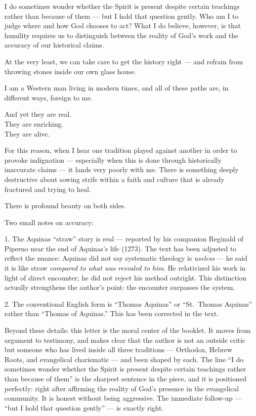 \documentclass[10pt,twoside,openany]{book}
\begin{document}
I do sometimes wonder whether the Spirit is present despite certain
teachings rather than because of them --- but I hold that question
gently. Who am I to judge where and how God chooses to act? What I do
believe, however, is that humility requires us to distinguish between
the reality of God's work and the accuracy of our historical claims.

At the very least, we can take care to get the history right --- and
refrain from throwing stones inside our own glass house.

I am a Western man living in modern times, and all of these paths are,
in different ways, foreign to me.

\bigskip

And yet they are real.\\
They are enriching.\\
They are alive.

\bigskip

For this reason, when I hear one tradition played against another in
order to provoke indignation --- especially when this is done through
historically inaccurate claims --- it lands very poorly with me. There is
something deeply destructive about sowing strife within a faith and
culture that is already fractured and trying to heal.

\medskip

There is profound beauty on both sides.

\begin{reviewerfinalbox}
Two small notes on accuracy:

1. The Aquinas ``straw'' story is real --- reported by his
companion Reginald of Piperno near the end of Aquinas's
life (1273). The text has been adjusted to reflect the
nuance: Aquinas did not say systematic theology is
\emph{useless} --- he said it is like straw \emph{compared to what
was revealed to him}. He relativized his work in light
of direct encounter; he did not reject his method
outright. This distinction actually strengthens the
author's point: the encounter surpasses the system.

2. The conventional English form is ``Thomas Aquinas''
or ``St.\ Thomas Aquinas'' rather than ``Thomas of
Aquinas.'' This has been corrected in the text.

Beyond these details: this letter is the moral center
of the booklet. It moves from argument to testimony,
and makes clear that the author is not an outside
critic but someone who has lived inside all three
traditions --- Orthodox, Hebrew Roots, and evangelical
charismatic --- and been shaped by each. The line ``I do
sometimes wonder whether the Spirit is present despite
certain teachings rather than because of them'' is the
sharpest sentence in the piece, and it is positioned
perfectly: right after affirming the reality of God's
presence in the evangelical community. It is honest
without being aggressive. The immediate follow-up ---
``but I hold that question gently'' --- is exactly right.
\end{reviewerfinalbox}
\end{document}
